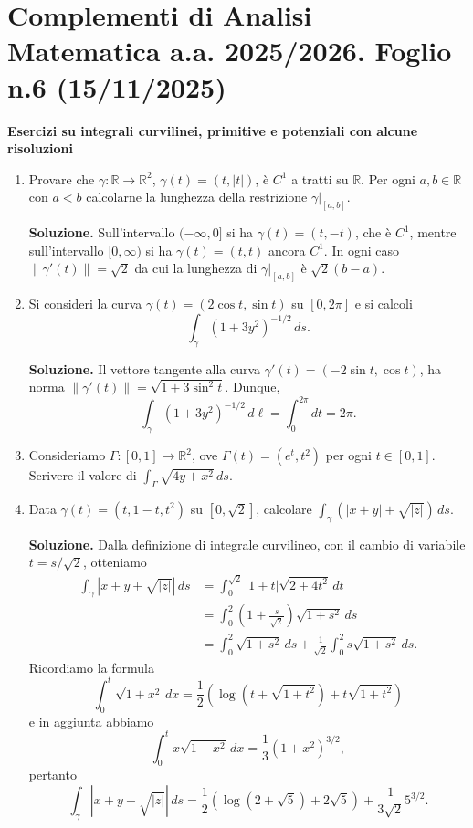 \section{Complementi di Analisi Matematica a.a. 2025/2026. Foglio n.6 (15/11/2025)}

\textbf{Esercizi su integrali curvilinei, primitive e potenziali con alcune risoluzioni}

\begin{enumerate}
	\item Provare che $\gamma: \mathbb{R} \to \mathbb{R}^2$, $\gamma(t) = (t, |t|)$, è $C^1$ a tratti su $\mathbb{R}$. Per ogni $a, b \in \mathbb{R}$ con $a < b$ calcolarne la lunghezza della restrizione $\left.\gamma\right|_{[a, b]}$.
	
	\textbf{Soluzione.}
		Sull'intervallo $(-\infty, 0]$ si ha $\gamma(t) = (t, -t)$, che è $C^1$, mentre sull'intervallo $[0, \infty)$ si ha $\gamma(t) = (t, t)$ ancora $C^1$. In ogni caso $\|\gamma'(t)\| = \sqrt{2}$ da cui la lunghezza di $\left.\gamma\right|_{[a, b]}$ è $\sqrt{2}(b - a)$.
	
	
	\item Si consideri la curva $\gamma(t) = (2\cos t, \sin t)$ su $[0, 2\pi]$ e si calcoli
	\[
	\int_{\gamma} (1 + 3y^2)^{-1/2} \, ds.
	\]
	
	\textbf{Soluzione.}
		Il vettore tangente alla curva $\gamma'(t) = (-2\sin t, \cos t)$, ha norma $\|\gamma'(t)\| = \sqrt{1 + 3\sin^2 t}$. Dunque,
		\[
		\int_{\gamma} (1 + 3y^2)^{-1/2} \, d\ell = \int_0^{2\pi} dt = 2\pi.
		\]
	
	
	\item Consideriamo $\Gamma: [0,1] \to \mathbb{R}^2$, ove $\Gamma(t) = (e^t, t^2)$ per ogni $t \in [0,1]$. Scrivere il valore di $\int_{\Gamma} \sqrt{4y + x^2} \, ds$.
	
	\item Data $\gamma(t) = (t, 1 - t, t^2)$ su $[0, \sqrt{2}]$, calcolare $\int_{\gamma} \left(|x + y| + \sqrt{|z|}\right) \, ds$.
	
	\textbf{Soluzione.}
		Dalla definizione di integrale curvilineo, con il cambio di variabile $t = s / \sqrt{2}$, otteniamo
		\[
		\begin{aligned}
			\int_{\gamma} |x + y + \sqrt{|z|} | \, ds &= \int_0^{\sqrt{2}} |1 + t| \sqrt{2 + 4t^2} \, dt \\
			&= \int_0^2 \left(1 + \frac{s}{\sqrt{2}}\right) \sqrt{1 + s^2} \, ds \\
			&= \int_0^2 \sqrt{1 + s^2} \, ds + \frac{1}{\sqrt{2}} \int_0^2 s \sqrt{1 + s^2} \, ds.
		\end{aligned}
		\]
		Ricordiamo la formula
		\[
		\int_0^t \sqrt{1 + x^2} \, dx = \frac{1}{2} \left(\log \left(t + \sqrt{1 + t^2}\right) + t \sqrt{1 + t^2}\right)
		\]
		e in aggiunta abbiamo
		\[
		\int_0^t x \sqrt{1 + x^2} \, dx = \frac{1}{3} \left(1 + x^2\right)^{3/2},
		\]
		pertanto
		\[
		\int_{\gamma} |x + y + \sqrt{|z|} | \, ds = \frac{1}{2} \left(\log (2 + \sqrt{5}) + 2\sqrt{5}\right) + \frac{1}{3\sqrt{2}} 5^{3/2}.
		\]
	

\end{enumerate}
